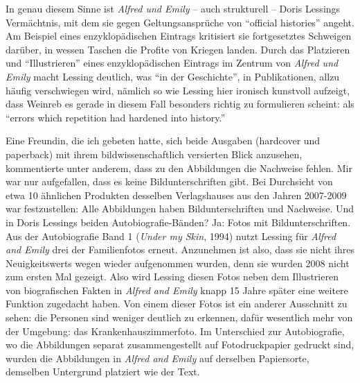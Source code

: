 \documentclass[fontsize=12pt]{scrartcl}
\begin{document}
In genau diesem Sinne ist \textit{Alfred und Emily} -- auch strukturell -- Doris Lessings Verm\"achtnis, mit dem sie gegen Geltungsanspr\"uche von "`official histories"' angeht. Am Beispiel eines enzyklop\"adischen Eintrags kritisiert sie fortgesetztes Schweigen dar\"uber, in wessen Taschen die Profite von Kriegen landen.
Durch das Platzieren und "`Illustrieren"' eines enzyklop\"adischen Eintrags im Zentrum von \textit{Alfred und Emily} macht Lessing deutlich, was "`in der Geschichte"', in Publikationen, allzu h\"aufig verschwiegen wird, n\"amlich so wie Lessing \mbox{hier} ironisch kunstvoll aufzeigt, dass Weinreb es gerade in diesem Fall besonders richtig zu formulieren scheint: als "`errors which repetition had hardened into history."'

Eine Freundin\textsuperscript{\tiny *}, die ich gebeten hatte, sich beide Ausgaben (hardcover und paperback) mit ihrem bildwissenschaftlich versierten Blick anzusehen, kommentierte unter anderem, dass zu den Abbildungen die Nachweise fehlen. Mir war nur aufgefallen, dass es keine Bildunterschriften gibt. Bei Durchsicht von etwa 10 \"ahnlichen Produkten desselben Verlagshauses aus den Jahren 2007-2009 war festzustellen: Alle Abbildungen haben Bildunterschriften und Nachweise. Und in Doris Lessings beiden Autobiografie-B\"anden? Ja: Fotos mit Bildunterschriften. Aus der Autobiografie Band 1 (\textit{Under my Skin}, 1994) nutzt Lessing f\"ur \textit{Alfred and Emily} drei der Familienfotos erneut. Anzunehmen ist also, dass sie nicht ihres Neuigkeitswerts wegen wieder aufgenommen wurden, denn sie wurden 2008 nicht zum ersten Mal gezeigt. Also wird Lessing diesen Fotos neben dem Illustrieren von biografischen Fakten in \textit{Alfred and Emily} knapp 15 Jahre sp\"ater eine weitere Funktion zugedacht haben. Von einem dieser Fotos ist ein an\-de\-rer Ausschnitt zu sehen: die Per\-so\-nen sind weniger deutlich zu erkennen, daf\"ur we\-sent\-lich mehr von der Umgebung: das Krankenhauszimmerfoto. Im Unterschied zur Autobiografie, wo die Abbildungen separat zusammengestellt auf Fotodruckpapier gedruckt sind, wurden die Abbildungen in \textit{Alfred and Emily} auf derselben Papiersorte, demselben Untergrund platziert wie der Text. 
\end{document}
